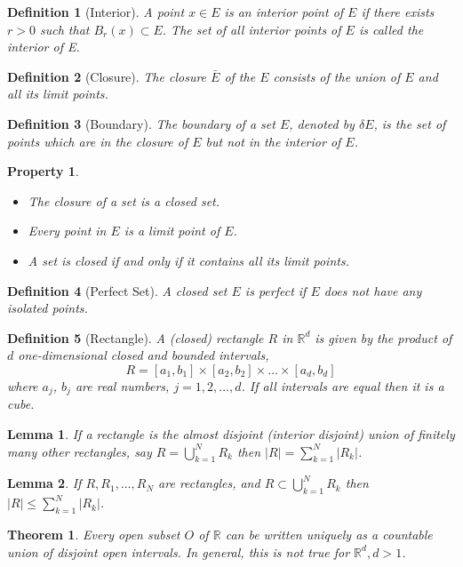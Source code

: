 \documentclass{report}
\theoremstyle{upthm}
\newtheorem{thm}{Theorem}
\newtheorem{defn}{Definition}
\newtheorem{lemma}{Lemma}
\newtheorem{property}{Property}
\newcommand{\reals}{\mathbb{R}}
\newcommand{\union}{\bigcup}
\begin{document}
\begin{defn}[Interior]
	A point $x \in E$ is an interior point of $E$ if there exists $r > 0$ such that $B_r(x) \subset E$. The set of all interior points of $E$ is called the interior of E.
\end{defn}
\begin{defn}[Closure]
	The closure $\bar{E}$ of the $E$ consists of the union of $E$ and all
	its limit points.
\end{defn}
\begin{defn}[Boundary]
	The boundary of a set $E$, denoted by $\delta E$, is the set of	points which are in the closure of $E$ but not in the interior of $E$.
\end{defn}
\begin{property}\item
	\begin{itemize}
		\item The closure of a set is a closed set.
		\item Every point in $E$ is a limit point of $E$.
		\item A set is closed if and only if it contains all its limit points.
	\end{itemize}
\end{property}
\begin{defn}[Perfect Set]
	A closed set $E$ is perfect if $E$ does not have any isolated points.
\end{defn}

\begin{defn}[Rectangle]
	A (closed) rectangle $R$ in $\reals^d$ is given by the product of $d$ one-dimensional
	closed and bounded intervals,
	$$R = [a_1, b_1] \times [a_2, b_2] \times \dots \times [a_d, b_d]$$
	where $a_j$, $b_j$ are real numbers, $j = 1, 2, \dots, d$. If all intervals are equal then it is a cube.
\end{defn}

\begin{lemma}
	If a rectangle is the almost disjoint (interior disjoint) union of finitely many other rectangles, say $R = \union_{k=1}^N R_k $ then $|R| = \sum_{k=1}^{N} |R_k|$.
\end{lemma}

\begin{lemma}
	If $R, R_1, \dots,R_N$ are rectangles, and $R \subset \union_{k=1}^{N} R_k $ then$|R| \leq \sum_{k=1}^{N} |R_k|$.
\end{lemma}

\begin{thm}
	Every open subset $O$ of $\reals$ can be written uniquely as a countable union of disjoint open intervals. In general, this is not true for $\reals^d, d > 1$.
\end{thm}
\end{document}
